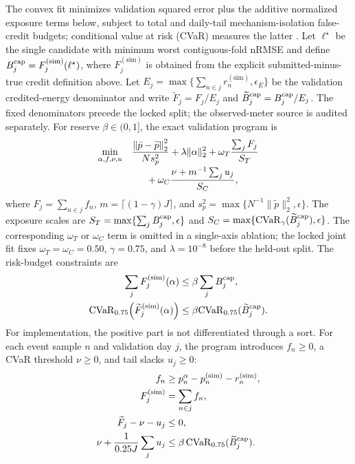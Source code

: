 \documentclass[10pt,journal]{IEEEtran}
\begin{document}
The convex fit minimizes validation squared error plus the additive normalized
exposure terms below, subject to total and daily-tail mechanism-isolation
false-credit budgets; conditional value at risk (CVaR) measures the latter
\cite{rockafellar2000cvar}. Let
$\ell^\star$ be the single candidate with minimum worst contiguous-fold nRMSE
and define $B_j^{\rm cap}=F_j^{(\mathrm{sim})}(\ell^\star)$, where
$F_j^{(\mathrm{sim})}$ is obtained from the explicit submitted-minus-true
credit definition above. Let
$E_j=\max\{\sum_{n\in j}r_n^{(\mathrm{sim})},\epsilon_E\}$ be the
validation credited-energy denominator and write
$\widetilde F_j=F_j/E_j$ and $\widetilde B_j^{\rm cap}=B_j^{\rm cap}/E_j$.
The fixed denominators precede the locked split; the observed-meter source is
audited separately. For reserve $\beta\in(0,1]$, the exact validation program is
\begin{equation}
\begin{aligned}
\min_{\alpha,f,\nu,u}\quad
&\frac{\left\|\bar p-\widetilde p\right\|_2^2}{N s_p^2}
 +\lambda\|\alpha\|_2^2
 +\omega_T\frac{\sum_j F_j}{S_T}\\[-2pt]
&\hspace{1.5em}+\omega_C\frac{\nu+m^{-1}\sum_j u_j}{S_C},
\end{aligned}
\label{eq:riskobjective}
\end{equation}
where $F_j=\sum_{n\in j}f_n$, $m=\lceil(1-\gamma)J\rceil$, and
\(s_p^2=\max\{N^{-1}\|\widetilde p\|_2^2,\epsilon\}\).
The exposure scales are \(S_T=\max\{\sum_jB_j^{\rm cap},\epsilon\}\) and
\(S_C=\max\{{\rm CVaR}_{\gamma}(\widetilde B_j^{\rm cap}),\epsilon\}\).
The corresponding $\omega_T$ or $\omega_C$ term is omitted in a single-axis
ablation; the locked joint fit fixes
$\omega_T=\omega_C=0.50$, $\gamma=0.75$, and $\lambda=10^{-8}$ before the
held-out split. The risk-budget constraints are
\begin{align}
 \sum_jF_j^{(\mathrm{sim})}(\alpha)&\leq\beta\sum_jB_j^{\rm cap},\label{eq:totalrisk}\\
 {\rm CVaR}_{0.75}\!\left(\widetilde F_j^{(\mathrm{sim})}(\alpha)\right)
 &\leq\beta{\rm CVaR}_{0.75}(\widetilde B_j^{\rm cap}).\label{eq:cvar}
\end{align}
For implementation, the positive part is not differentiated through a sort. For
each event sample $n$ and validation day $j$, the program introduces
$f_n\geq0$, a CVaR threshold $\nu\geq0$, and tail slacks $u_j\geq0$:
 \begin{align}
  f_n&\geq p^\alpha_n-p^{(\mathrm{sim})}_n-r^{(\mathrm{sim})}_n,\\
  F_j^{(\mathrm{sim})}&=\sum_{n\in j}f_n,\\
  \widetilde F_j-\nu-u_j&\leq0,\\
  \nu+\frac{1}{0.25J}\sum_j u_j
  &\leq\beta\,\mathrm{CVaR}_{0.75}(\widetilde B_j^{\rm cap}).
  \label{eq:riskepigraph}
 \end{align}
\end{document}
